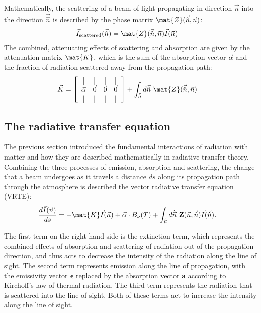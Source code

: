 Mathematically, the scattering of a beam of light propagating in direction
$\vec{n}$ into the direction $\vec{\hat{n}}$ is described by the phase
matrix $\mat{Z}(\vec{\hat{n}}, \vec{n})$:
\begin{align}
  \vec{I}_\text{scattered}(\vec{\hat{n}}) &= \mat{Z}(\vec{\hat{n}}, \vec{n}) \vec{I}(\vec{n})
\end{align}
The combined, attenuating effects of scattering and absorption are given by
the attenuation matrix $\mat{K}$, which is the sum of the absorption vector
$\vec{\alpha}$ and the fraction of radiation scattered away from the propagation
path:
\newcommand*{\vertbar}{\rule[-1ex]{0.5pt}{2.5ex}}
\newcommand*{\horzbar}{\rule[.5ex]{2.5ex}{0.5pt}}
\begin{align}
  \vec{K} &=
  \left [ \begin{array}{cccc}
      \vertbar & \vertbar & \vertbar & \vertbar \\
      \vec{\alpha} & \vec{0} & \vec{0} & \vec{0} \\
      \vertbar & \vertbar & \vertbar & \vertbar
    \end{array} \right ]
       + \int_{\vec{\hat{n}}} d\vec{\hat{n}}\ \mat{Z}(\vec{\hat{n}}, \vec{n})
\end{align}


\subsection{The radiative transfer equation}

The previous section introduced the fundamental interactions of radiation
with matter and how they are described mathematically in radiative transfer
theory. Combining the three processes of emission, absorption and scattering,
the change that a beam undergoes as it travels a distance $ds$ along its
propagation path through the atmosphere is described the vector radiative
transfer equation (VRTE):
\begin{align}\label{eq:vrte}
  \frac{d\vec{I}(\vec{n})}{ds} &=
  -\mat{K}\vec{I}(\vec{n}) + \vec{\alpha} \cdot B_\nu(T) + \int_{\hat{\vec{n}}} d\hat{\vec{n}} \ \mathbf{Z}(\vec{n}, \vec{\hat{n}}) \vec{I}(\vec{\hat{n}}).
  \end{align}

The first term on the right hand side is the extinction term, which represents
the combined effects of absorption and scattering of radiation out of the
propagation direction, and thus acts to decrease the intensity of the radiation
along the line of sight. The second term represents emission along the line of
propagation, with the emissivity vector $\bm{\epsilon}$ replaced by the
absorption vector $\bm{a}$ according to Kirchoff's law of thermal radiation. The
third term represents the radiation that is scattered into the line of sight.
Both of these terms act to increase the intensity along the line of sight.

